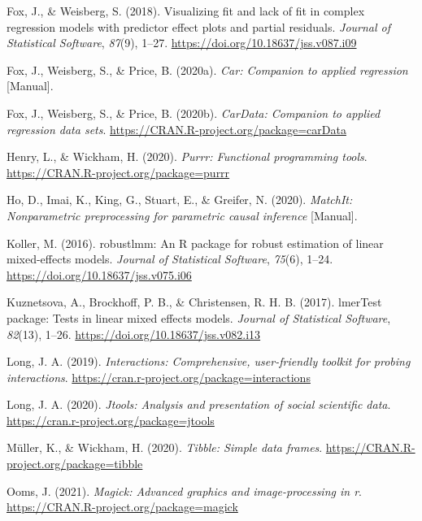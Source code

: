 \begin{appendix}
\leavevmode\hypertarget{ref-R-effects_a}{}%
Fox, J., \& Weisberg, S. (2018). Visualizing fit and lack of fit in
complex regression models with predictor effect plots and partial
residuals. \emph{Journal of Statistical Software}, \emph{87}(9), 1--27.
\url{https://doi.org/10.18637/jss.v087.i09}

\leavevmode\hypertarget{ref-R-car}{}%
Fox, J., Weisberg, S., \& Price, B. (2020a). \emph{Car: Companion to
applied regression} {[}Manual{]}.

\leavevmode\hypertarget{ref-R-carData}{}%
Fox, J., Weisberg, S., \& Price, B. (2020b). \emph{CarData: Companion to
applied regression data sets}.
\url{https://CRAN.R-project.org/package=carData}

\leavevmode\hypertarget{ref-R-purrr}{}%
Henry, L., \& Wickham, H. (2020). \emph{Purrr: Functional programming
tools}. \url{https://CRAN.R-project.org/package=purrr}

\leavevmode\hypertarget{ref-R-MatchIt}{}%
Ho, D., Imai, K., King, G., Stuart, E., \& Greifer, N. (2020).
\emph{MatchIt: Nonparametric preprocessing for parametric causal
inference} {[}Manual{]}.

\leavevmode\hypertarget{ref-R-robustlmm}{}%
Koller, M. (2016). robustlmm: An R package for robust estimation of
linear mixed-effects models. \emph{Journal of Statistical Software},
\emph{75}(6), 1--24. \url{https://doi.org/10.18637/jss.v075.i06}

\leavevmode\hypertarget{ref-R-lmerTest}{}%
Kuznetsova, A., Brockhoff, P. B., \& Christensen, R. H. B. (2017).
lmerTest package: Tests in linear mixed effects models. \emph{Journal of
Statistical Software}, \emph{82}(13), 1--26.
\url{https://doi.org/10.18637/jss.v082.i13}

\leavevmode\hypertarget{ref-R-interactions}{}%
Long, J. A. (2019). \emph{Interactions: Comprehensive, user-friendly
toolkit for probing interactions}.
\url{https://cran.r-project.org/package=interactions}

\leavevmode\hypertarget{ref-R-jtools}{}%
Long, J. A. (2020). \emph{Jtools: Analysis and presentation of social
scientific data}. \url{https://cran.r-project.org/package=jtools}

\leavevmode\hypertarget{ref-R-tibble}{}%
Müller, K., \& Wickham, H. (2020). \emph{Tibble: Simple data frames}.
\url{https://CRAN.R-project.org/package=tibble}

\leavevmode\hypertarget{ref-R-magick}{}%
Ooms, J. (2021). \emph{Magick: Advanced graphics and image-processing in
r}. \url{https://CRAN.R-project.org/package=magick}


\end{appendix}
